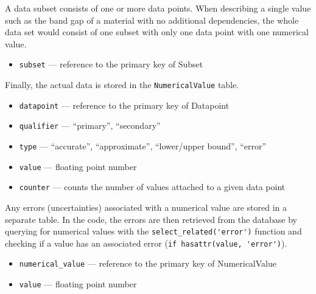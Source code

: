 \documentclass{article}
\begin{document}
A data subset consists of one or more data points. When describing a single value such as the band gap of a material with no additional dependencies, the whole data set would consist of one subset with only one data point with one numerical value.
\begin{tcolorbox}[colback=green!5,colframe=green!40!black,title=Datapoint(Base)]
  \begin{itemize}
  \item \texttt{subset} --- reference to the primary key of Subset
  \end{itemize}
\end{tcolorbox}

Finally, the actual data is stored in the \texttt{NumericalValue} table.
\begin{tcolorbox}[colback=green!5,colframe=green!40!black,title=NumericalValue(Base)]
  \begin{itemize}
  \item \texttt{datapoint} --- reference to the primary key of Datapoint
  \item \texttt{qualifier} --- ``primary'', ``secondary''
  \item \texttt{type} --- ``accurate'', ``approximate'', ``lower/upper bound'', ``error''
  \item \texttt{value} --- floating point number
  \item \texttt{counter} --- counts the number of values attached to a given data point
  \end{itemize}
\end{tcolorbox}

Any errors (uncertainties) associated with a numerical value are stored in a separate table. In the code, the errors are then retrieved from the database by querying for numerical values with the \verb+select_related('error')+ function and checking if a value has an associated error (\verb+if hasattr(value, 'error')+).
\begin{tcolorbox}[colback=green!5,colframe=green!40!black,title=Error(Base)]
  \begin{itemize}
  \item \texttt{numerical\_value} --- reference to the primary key of NumericalValue
  \item \texttt{value} --- floating point number
  \end{itemize}
\end{tcolorbox}
\end{document}
